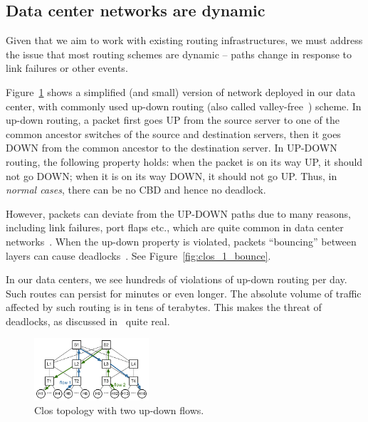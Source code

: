 \subsection{Data center networks are dynamic}\label{sec:reroute}

Given that we aim to work with existing routing infrastructures, we must
address the issue that most routing schemes are dynamic -- paths change in
response to link failures or other events.

Figure~\ref{fig:basic_clos} shows a simplified (and small) version
of network deployed in our data center, with commonly used up-down routing (also
called valley-free~\cite{qiu2007toward}) scheme.  In up-down routing, a packet first
goes UP from the source server to one of the common ancestor switches of the
source and destination servers, then it goes DOWN from the common ancestor to
the destination server.  In UP-DOWN routing, the following property holds: when
the packet is on its way UP, it should not go DOWN; when it is on its way DOWN,
it should not go UP. Thus, in {\em normal cases}, there can be no CBD and hence
no deadlock.

However, packets can deviate from the UP-DOWN paths due to many reasons,
including link failures, port flaps etc., which are quite common in data
center networks~\cite{netpilot,f10}. When the up-down property is violated,
packets ``bouncing'' between layers can cause
deadlocks~\cite{shpiner2016unlocking}. See
Figure~\ref{fig:clos_1_bounce}.

In our data centers, we see hundreds of violations of up-down routing per
day. Such routes can persist for minutes or even longer. %
The absolute volume of traffic affected by such routing is in tens of terabytes. This makes the threat of deadlocks, as discussed
in~\cite{rdmaatscale,shpiner2016unlocking,hu2016deadlocks} quite real.

\begin{figure}[t]
		\centering
		\includegraphics[width=0.38\textwidth] {figs/updown_paths}
		\vspace{-1em}
		\caption{Clos topology with two up-down flows.}
		\vspace{-1.5em}
		\label{fig:basic_clos}
\end{figure}

